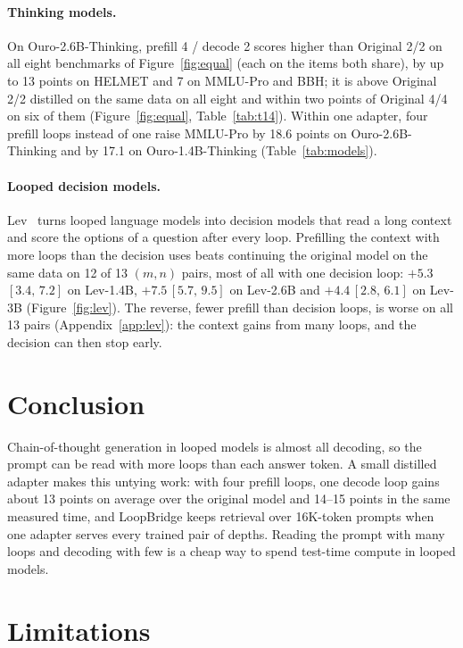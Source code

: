 \documentclass[11pt]{article}
\newcommand{\ci}[2]{\,{\scriptsize\ensuremath{[#1,\,#2]}}}
\begin{document}
\paragraph{Thinking models.} On Ouro-2.6B-Thinking, prefill 4 / decode 2 scores higher than Original 2/2 on all eight
benchmarks of Figure~\ref{fig:equal} (each on the items both share), by up to 13 points on HELMET and 7 on MMLU-Pro
and BBH; it is above Original 2/2 distilled on the same data
on all eight and within two points of Original 4/4 on six of them (Figure~\ref{fig:equal}, Table~\ref{tab:t14}).
Within one adapter, four prefill loops instead of one raise MMLU-Pro by 18.6 points on Ouro-2.6B-Thinking and by 17.1
on Ouro-1.4B-Thinking (Table~\ref{tab:models}).

\paragraph{Looped decision models.} Lev~\citep{lev} turns looped language models into decision models that read a long
context and score the options of a question after every loop. Prefilling the context with more loops than the
decision uses beats continuing the original model on the same data on 12 of 13 $(m,n)$ pairs, most of all with one
decision loop: $+5.3$\ci{3.4}{7.2} on Lev-1.4B, $+7.5$\ci{5.7}{9.5} on Lev-2.6B and $+4.4$\ci{2.8}{6.1} on Lev-3B
(Figure~\ref{fig:lev}). The reverse, fewer prefill than decision loops, is worse on all 13 pairs
(Appendix~\ref{app:lev}): the context gains from many loops, and the decision can then stop early.

\section{Conclusion}

Chain-of-thought generation in looped models is almost all decoding, so the prompt can be read with more loops than
each answer token.
A small distilled adapter makes this untying work: with four prefill loops, one decode loop gains about 13 points on
average over the original model and 14--15 points in the same measured time, and LoopBridge keeps retrieval over
16K-token prompts when one adapter serves every trained pair of depths. Reading the prompt with many loops and decoding with few is a cheap way to spend test-time compute in
looped models.

\section*{Limitations}
\label{sec:limits}
\end{document}
